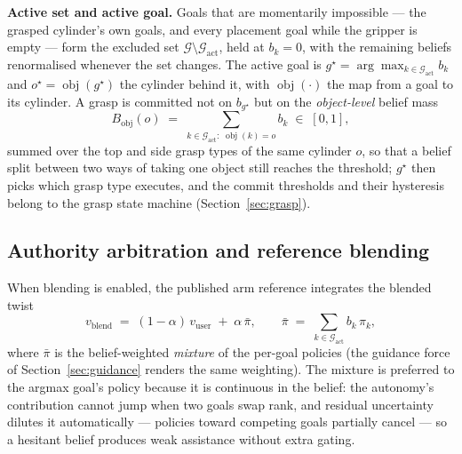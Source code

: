 \documentclass[12pt,a4paper,twoside,openright]{report}
\begin{document}
\textbf{Active set and active goal.} Goals that are momentarily impossible --- the grasped cylinder's own goals, and every placement goal while the gripper is empty --- form the excluded set $\mathcal{G} \setminus \mathcal{G}_{\text{act}}$, held at $b_k = 0$, with the remaining beliefs renormalised whenever the set changes. The active goal is $g^{\star} = \arg\max_{k \in \mathcal{G}_{\text{act}}} b_k$ and $o^{\star} = \operatorname{obj}(g^{\star})$ the cylinder behind it, with $\operatorname{obj}(\cdot)$ the map from a goal to its cylinder. A grasp is committed not on $b_{g^{\star}}$ but on the \emph{object-level} belief mass
\begin{equation}
B_{\text{obj}}(o) \;=\; \sum_{k \in \mathcal{G}_{\text{act}}:\; \operatorname{obj}(k) = o} b_k \;\in\; [0,1],
\label{eq:objbelief}
\end{equation}
summed over the top and side grasp types of the same cylinder $o$, so that a belief split between two ways of taking one object still reaches the threshold; $g^{\star}$ then picks which grasp type executes, and the commit thresholds and their hysteresis belong to the grasp state machine (Section~\ref{sec:grasp}).

\subsection{Authority arbitration and reference blending}
\label{sec:blend}

When blending is enabled, the published arm reference integrates the blended twist~\cite{dragan2013policy}
\begin{equation}
v_{\text{blend}} \;=\; (1-\alpha)\,v_{\text{user}} \;+\; \alpha\,\bar{\pi},
\qquad
\bar{\pi} \;=\; \sum_{k \in \mathcal{G}_{\text{act}}} b_k\,\pi_k,
\label{eq:blend}
\end{equation}
where $\bar{\pi}$ is the belief-weighted \emph{mixture} of the per-goal policies (the guidance force of Section~\ref{sec:guidance} renders the same weighting). The mixture is preferred to the argmax goal's policy because it is continuous in the belief: the autonomy's contribution cannot jump when two goals swap rank, and residual uncertainty dilutes it automatically --- policies toward competing goals partially cancel --- so a hesitant belief produces weak assistance without extra gating.
\end{document}

